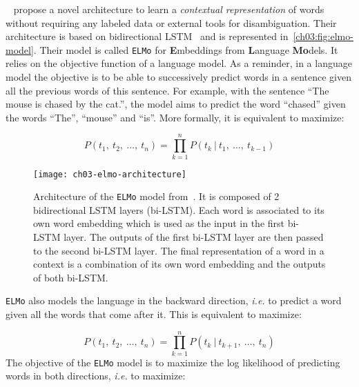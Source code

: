    \citeauthor{peters2018elmo}~\citep{peters2018elmo} propose a novel
    architecture to learn a \textit{contextual representation} of words without
    requiring any labeled data or external tools for disambiguation. Their
    architecture is based on bidirectional LSTM~\citep{huang2015bidirectional}
    and is represented in~\autoref{ch03:fig:elmo-model}. Their model is called
    \texttt{ELMo} for \textbf{E}mbeddings from \textbf{L}anguage
    \textbf{Mo}dels. It relies on the objective function of a language model. As
    a reminder, in a language model the objective is to be able to successively
    predict words in a sentence given all the previous words of this sentence.
    For example, with the sentence ``The mouse is chased by the cat.'', the
    model aims to predict the word ``chased'' given the words ``The'', ``mouse''
    and ``is''. More formally, it is equivalent to maximize:

    \begin{equation}
      P(t_1, ~t_2, ~\dots, ~t_n) = \prod_{k=1}^n P(t_k~|~t_1,~\dots,~t_{k-1})
    \end{equation}

    \begin{figure}[b!]
      \centering
      \texttt{[image: ch03-elmo-architecture]}
      \caption[Architecture of the \texttt{ELMo} model from
      \citeauthor{peters2018elmo}.] {Architecture of the \texttt{ELMo} model
      from~\citep{peters2018elmo}. It is composed of 2 bidirectional LSTM layers
      (bi-LSTM). Each word is associated to its own word embedding which is
      used as the input in the first bi-LSTM layer. The outputs of the first
      bi-LSTM layer are then passed to the second bi-LSTM layer. The final
      representation of a word in a context is a combination of its own word
      embedding and the outputs of both bi-LSTM.}
      \label{ch03:fig:elmo-model}
    \end{figure}

    \medbreak
    \noindent \texttt{ELMo} also models the language in the backward direction,
    \textit{i.e.} to predict a word given all the words that come after it. This
    is equivalent to maximize:

    \begin{equation}
      P(t_1,~t_2,~\dots,~t_n) = \prod_{k=1}^n P(t_k~|~t_{k+1},~\dots,~t_{n})
    \end{equation}
    The objective of the \texttt{ELMo} model is to maximize the log likelihood
    of predicting words in both directions, \textit{i.e.} to maximize:

